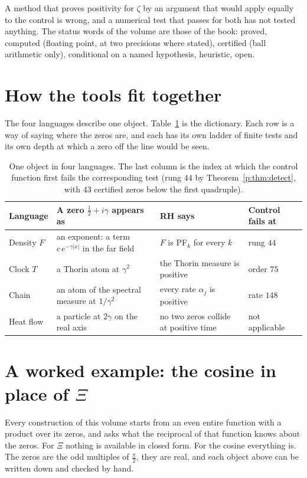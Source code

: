 A method that proves positivity for $\zeta$ by an argument that would apply equally to the control is wrong, and a numerical test that passes for both has not tested anything. The status words of the volume are those of the book: proved, computed (floating point, at two precisions where stated), certified (ball arithmetic only), conditional on a named hypothesis, heuristic, open.

\section{How the tools fit together}\label{t:sec:fit}

The four languages describe one object. Table~\ref{t:tab:dict} is the dictionary. Each row is a way of saying where the zeros are, and each has its own ladder of finite tests and its own depth at which a zero off the line would be seen.

\begin{table}[ht]
\centering\small
\caption{One object in four languages. The last column is the index at which the control function first fails the corresponding test (rung $44$ by Theorem~\ref{p:thm:detect}, with $43$ certified zeros below the first quadruple).}\label{t:tab:dict}
\begin{tabular}{@{}p{}p{}p{}p{}@{}}
\toprule
Language & A zero $\frac12+i\gamma$ appears as & RH says & Control fails at\\
\midrule
Density $F$ & an exponent: a term $c\,e^{-\gamma|x|}$ in the far field & $F$ is PF$_k$ for every $k$ & rung $44$\\
Clock $T$ & a Thorin atom at $\gamma^2$ & the Thorin measure is positive & order $75$\\
Chain & an atom of the spectral measure at $1/\gamma^2$ & every rate $\alpha_j$ is positive & rate $148$\\
Heat flow & a particle at $2\gamma$ on the real axis & no two zeros collide at positive time & not applicable\\
\bottomrule
\end{tabular}
\end{table}

\section{A worked example: the cosine in place of \texorpdfstring{$\Xi$}{Xi}}\label{e:sec:model}

Every construction of this volume starts from an even entire function with a product over its zeros, and asks what the reciprocal of that function knows about the zeros. For $\Xi$ nothing is available in closed form. For the cosine everything is. The zeros are the odd multiples of $\frac\pi2$, they are real, and each object above can be written down and checked by hand.

